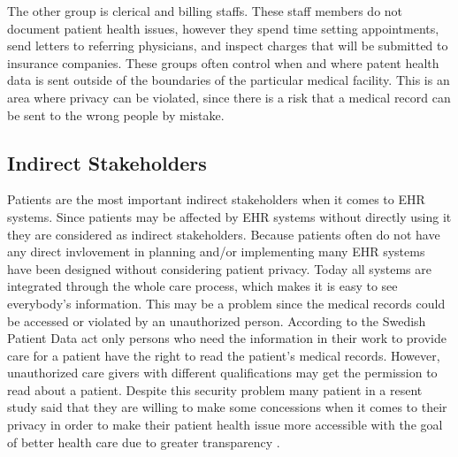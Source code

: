 \documentclass[14pt]{article}
\begin{document}
The other group is clerical and billing staffs. These staff members do not document patient health issues, however they spend time setting appointments, send letters to referring physicians, and inspect charges that will be submitted to insurance companies. These groups often control when and where patent health data is sent outside of the boundaries of the particular medical facility. This is an area where privacy can be violated, since there is a risk that a medical record can be sent to the wrong people by mistake. 

\subsection{Indirect Stakeholders}
\label{sec:peopleIndirect}
Patients are the most important indirect stakeholders when it comes to \gls{EHR} systems. Since patients may be affected by \gls{EHR} systems without directly using it they are considered as indirect stakeholders. Because patients often do not have any direct invlovement in planning and/or implementing many \gls{EHR} systems have been designed without considering patient privacy. Today all systems are integrated through the whole care process, which makes it is easy to see everybody's information. This may be a problem since the medical records could be accessed or violated by an unauthorized person. According to the Swedish Patient Data act \cite{PatientDataAct} only persons who need the information in their work to provide care for a patient have the right to read the patient's medical records. However, unauthorized care givers with different qualifications may get the permission to read  about a  patient. Despite this security problem many patient in a resent study said that they are willing to make some concessions when it comes to their privacy in order to make their patient health issue more accessible with the goal of better health care due to greater transparency \cite{Merrill}.
\end{document}

